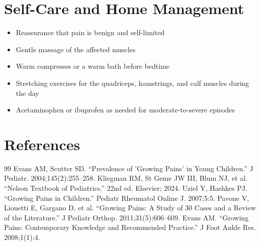\section*{Self-Care and Home Management}
\begin{itemize}
  \item Reassurance that pain is benign and self-limited
  \item Gentle massage of the affected muscles
  \item Warm compresses or a warm bath before bedtime
  \item Stretching exercises for the quadriceps, hamstrings, and calf muscles during the day
  \item Acetaminophen or ibuprofen as needed for moderate-to-severe episodes
\end{itemize}

\section*{References}
\begin{thebibliography}{99}
 Evans AM, Scutter SD. ``Prevalence of 'Growing Pains' in Young Children.'' J Pediatr. 2004;145(2):255--258.
 Kliegman RM, St Geme JW III, Blum NJ, et al. ``Nelson Textbook of Pediatrics.'' 22nd ed. Elsevier; 2024.
 Uziel Y, Hashkes PJ. ``Growing Pains in Children.'' Pediatr Rheumatol Online J. 2007;5:5.
 Pavone V, Lionetti E, Gargano D, et al. ``Growing Pains: A Study of 30 Cases and a Review of the Literature.'' J Pediatr Orthop. 2011;31(5):606--609.
 Evans AM. ``Growing Pains: Contemporary Knowledge and Recommended Practice.'' J Foot Ankle Res. 2008;1(1):4.
\end{thebibliography}
